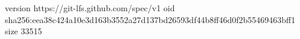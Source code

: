 version https://git-lfs.github.com/spec/v1
oid sha256:eea38c424a10e3d163b3552a27d137bd26593df44b8ff46d0f2b55469463bff1
size 33515
